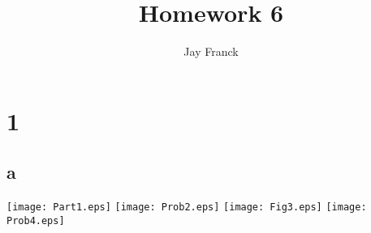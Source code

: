 \documentclass{article}
\begin{document}
\title{Homework 6}
\author{Jay Franck}
\maketitle


\section*{1}
\subsection*{a}


\texttt{[image: Part1.eps]} 
\texttt{[image: Prob2.eps]} 
\texttt{[image: Fig3.eps]} 
\texttt{[image: Prob4.eps]} 
\end{document}
